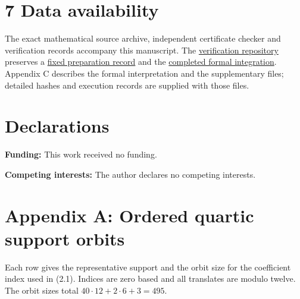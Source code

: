 \documentclass[11pt,a4paper]{article}
\begin{document}
\section*{7 Data availability}

The exact mathematical source archive, independent certificate checker and verification records accompany this manuscript. The \href{https://github.com/contatofilipevono-rgb/hrsbf-bent-verification}{verification repository} preserves a \href{https://github.com/contatofilipevono-rgb/hrsbf-bent-verification/tree/1e0e052/research_updates/2026_10_21_preprint}{fixed preparation record} and the \href{https://github.com/contatofilipevono-rgb/hrsbf-bent-verification/tree/9be0d98/research_updates/2026_10_20_final_integration}{completed formal integration}. Appendix C describes the formal interpretation and the supplementary files; detailed hashes and execution records are supplied with those files.

\section*{Declarations}

\textbf{Funding:} This work received no funding.

\textbf{Competing interests:} The author declares no competing interests.

\section*{Appendix A: Ordered quartic support orbits}

Each row gives the representative support and the orbit size for the coefficient index used in (2.1). Indices are zero based and all translates are modulo twelve. The orbit sizes total $40\cdot12+2\cdot6+3=495$.
\end{document}
